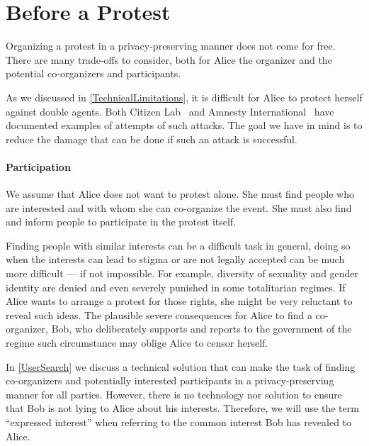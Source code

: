 \section{Before a Protest}
\label{BeforeProtest}

Organizing a protest in a privacy-preserving manner does not come for free.  
There are many trade-offs to consider, both for Alice the organizer and the 
potential co-organizers and participants.

As we discussed in \cref{TechnicalLimitations}, it is difficult for Alice to 
protect herself against double agents.
Both Citizen Lab~\cite{NilePhish} and Amnesty International~\cite{Kingphish} 
have documented examples of attempts of such attacks.
The goal we have in mind is to reduce the damage that can be done if such an 
attack is successful.

\paragraph{Participation}


We assume that Alice does not want to protest alone.
She must find people who are interested and with whom she can co-organize the 
event.
She must also find and inform people to participate in the protest itself.

Finding people with similar interests can be a difficult task in general, doing 
so when the interests can lead to stigma or are not legally accepted can be 
much more difficult --- if not impossible.
For example, diversity of sexuality and gender identity are denied and even 
severely punished in some totalitarian regimes.
If Alice wants to arrange a protest for those rights, she might be very 
reluctant to reveal such ideas.
The plausible severe consequences for Alice to find a co-organizer, Bob, who 
deliberately supports and reports to the government of the regime such 
circumstance may oblige Alice to censor herself. 

In \cref{UserSearch} we discuss a technical solution that can make the task of 
finding co-organizers and potentially interested participants in 
a privacy-preserving manner for all parties.
However, there is no technology nor solution to ensure that Bob is not lying to 
Alice about his interests.
Therefore, we will use the term \enquote{expressed interest} when referring to 
the common interest Bob has revealed to Alice.

